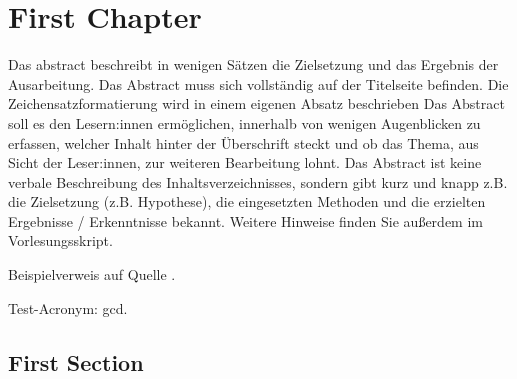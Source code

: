 

\newpage





\iffalse
	\chapter{First Chapter}

	Das \gls{abstract} beschreibt in wenigen Sätzen die Zielsetzung und das Ergebnis der Ausarbeitung. Das Abstract muss sich vollständig auf der Titelseite befinden. Die Zeichensatzformatierung wird in einem eigenen Absatz beschrieben  Das Abstract soll es den Lesern:innen ermöglichen, innerhalb von wenigen Augenblicken zu erfassen, welcher Inhalt hinter der Überschrift steckt und ob das Thema, aus Sicht der Leser:innen, zur weiteren Bearbeitung lohnt. Das Abstract ist keine verbale Beschreibung des Inhaltsverzeichnisses, sondern gibt kurz und knapp z.B. die Zielsetzung (z.B. Hypothese), die eingesetzten Methoden und die erzielten Ergebnisse / Erkenntnisse bekannt. Weitere Hinweise finden Sie außerdem im Vorlesungsskript.

	Beispielverweis auf Quelle \cite{ahrensAbschlussarbeiten}.

	Test-Acronym: \acrshort{gcd}.

	\section{First Section}

